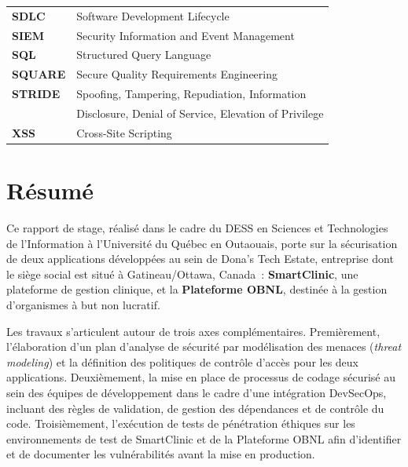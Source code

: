 \documentclass[12pt, a4paper, oneside]{report}
\begin{document}
\begin{tabular}{ll}
  \textbf{SDLC}      & Software Development Lifecycle                       \\
  \textbf{SIEM}      & Security Information and Event Management            \\
  \textbf{SQL}       & Structured Query Language                            \\
  \textbf{SQUARE}    & Secure Quality Requirements Engineering              \\
  \textbf{STRIDE}    & Spoofing, Tampering, Repudiation, Information        \\
                     & \quad Disclosure, Denial of Service, Elevation of Privilege \\
  \textbf{XSS}       & Cross-Site Scripting                                 \\
\end{tabular}
\clearpage

\chapter*{Résumé}
Ce rapport de stage, réalisé dans le cadre du DESS en Sciences et
Technologies de l'Information à l'Université du Québec en Outaouais, porte
sur la sécurisation de deux applications développées au sein de
Dona’s Tech Estate, entreprise dont le siège social est situé à Gatineau/Ottawa, Canada~: \textbf{SmartClinic}, une plateforme de gestion clinique,
et la \textbf{Plateforme OBNL}, destinée à la gestion d'organismes à but
non lucratif.

Les travaux s'articulent autour de trois axes complémentaires.
Premièrement, l'élaboration d'un plan d'analyse de sécurité par
modélisation des menaces (\textit{threat modeling}) et la définition des
politiques de contrôle d'accès pour les deux applications.
Deuxièmement, la mise en place de processus de codage sécurisé au sein
des équipes de développement dans le cadre d'une intégration DevSecOps,
incluant des règles de validation, de gestion des dépendances et de
contrôle du code.
Troisièmement, l'exécution de tests de pénétration éthiques sur les
environnements de test de SmartClinic et de la Plateforme OBNL afin
d'identifier et de documenter les vulnérabilités avant la mise en
production.

\clearpage

\setcounter{page}{1}
\end{document}
